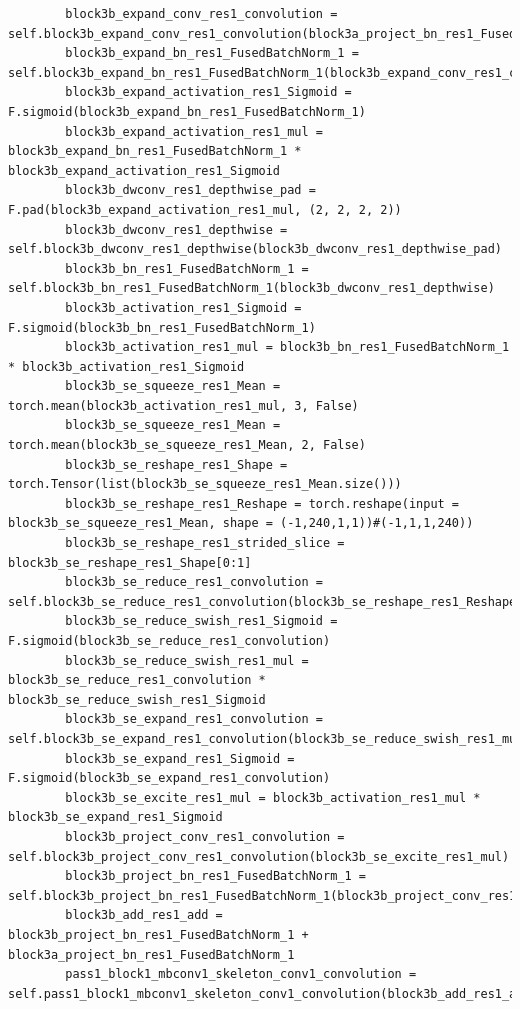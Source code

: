 \documentclass{fisatprojectfinal}
\begin{document}
\begin{appendices}
\begin{lstlisting}
        block3b_expand_conv_res1_convolution = self.block3b_expand_conv_res1_convolution(block3a_project_bn_res1_FusedBatchNorm_1)
        block3b_expand_bn_res1_FusedBatchNorm_1 = self.block3b_expand_bn_res1_FusedBatchNorm_1(block3b_expand_conv_res1_convolution)
        block3b_expand_activation_res1_Sigmoid = F.sigmoid(block3b_expand_bn_res1_FusedBatchNorm_1)
        block3b_expand_activation_res1_mul = block3b_expand_bn_res1_FusedBatchNorm_1 * block3b_expand_activation_res1_Sigmoid
        block3b_dwconv_res1_depthwise_pad = F.pad(block3b_expand_activation_res1_mul, (2, 2, 2, 2))
        block3b_dwconv_res1_depthwise = self.block3b_dwconv_res1_depthwise(block3b_dwconv_res1_depthwise_pad)
        block3b_bn_res1_FusedBatchNorm_1 = self.block3b_bn_res1_FusedBatchNorm_1(block3b_dwconv_res1_depthwise)
        block3b_activation_res1_Sigmoid = F.sigmoid(block3b_bn_res1_FusedBatchNorm_1)
        block3b_activation_res1_mul = block3b_bn_res1_FusedBatchNorm_1 * block3b_activation_res1_Sigmoid
        block3b_se_squeeze_res1_Mean = torch.mean(block3b_activation_res1_mul, 3, False)
        block3b_se_squeeze_res1_Mean = torch.mean(block3b_se_squeeze_res1_Mean, 2, False)
        block3b_se_reshape_res1_Shape = torch.Tensor(list(block3b_se_squeeze_res1_Mean.size()))
        block3b_se_reshape_res1_Reshape = torch.reshape(input = block3b_se_squeeze_res1_Mean, shape = (-1,240,1,1))#(-1,1,1,240))
        block3b_se_reshape_res1_strided_slice = block3b_se_reshape_res1_Shape[0:1]
        block3b_se_reduce_res1_convolution = self.block3b_se_reduce_res1_convolution(block3b_se_reshape_res1_Reshape)
        block3b_se_reduce_swish_res1_Sigmoid = F.sigmoid(block3b_se_reduce_res1_convolution)
        block3b_se_reduce_swish_res1_mul = block3b_se_reduce_res1_convolution * block3b_se_reduce_swish_res1_Sigmoid
        block3b_se_expand_res1_convolution = self.block3b_se_expand_res1_convolution(block3b_se_reduce_swish_res1_mul)
        block3b_se_expand_res1_Sigmoid = F.sigmoid(block3b_se_expand_res1_convolution)
        block3b_se_excite_res1_mul = block3b_activation_res1_mul * block3b_se_expand_res1_Sigmoid
        block3b_project_conv_res1_convolution = self.block3b_project_conv_res1_convolution(block3b_se_excite_res1_mul)
        block3b_project_bn_res1_FusedBatchNorm_1 = self.block3b_project_bn_res1_FusedBatchNorm_1(block3b_project_conv_res1_convolution)
        block3b_add_res1_add = block3b_project_bn_res1_FusedBatchNorm_1 + block3a_project_bn_res1_FusedBatchNorm_1
        pass1_block1_mbconv1_skeleton_conv1_convolution = self.pass1_block1_mbconv1_skeleton_conv1_convolution(block3b_add_res1_add)

\end{lstlisting}
\end{appendices}
\end{document}
